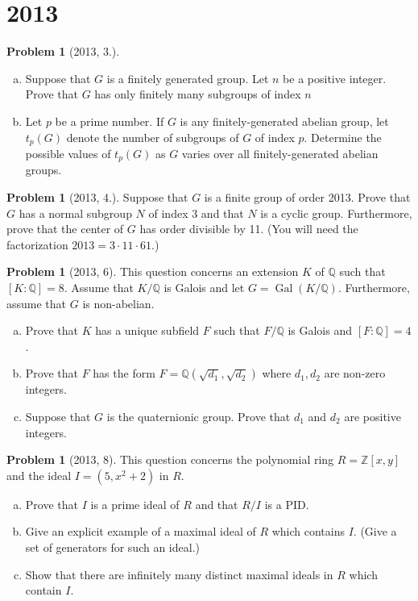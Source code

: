 \documentclass{article}
\newcommand{\<}{\langle} %
\renewcommand{\>}{\rangle} %
\DeclareMathOperator{\Gal}{Gal}
\theoremstyle{plain}
\theoremstyle{remark}
\theoremstyle{definition}
\newcounter{question}
\newtheorem{examproblem}[equation]{Problem}
\begin{document}
\newpage

\section{2013}

\begin{examproblem}[2013, 3.]
	\begin{enumerate}[(a)]
		\item Suppose that $G$ is a finitely generated group. Let $n$
			be a positive integer. Prove that $G$ has only finitely
			many subgroups of index $n$
		\item Let $p$ be a prime number. If $G$ is any finitely-generated
			abelian group, let $t_p(G)$ denote the number of
			subgroups of $G$ of index $p$. Determine the possible
			values of $t_p(G)$ as $G$ varies over all
			finitely-generated abelian groups.
	\end{enumerate}
\end{examproblem}

\begin{examproblem}[2013, 4.]
	Suppose that $G$ is a finite group of order 2013. Prove that $G$ has
	a normal subgroup $N$ of index 3 and that $N$ is a cyclic group.
	Furthermore, prove that the center of $G$ has order divisible by 11.
	(You will need the factorization $2013=3\cdot11\cdot61$.)
\end{examproblem}

\begin{examproblem}[2013, 6]
	This question concerns an extension $K$ of $\mathbb Q$ such that
	$[K:\mathbb Q]=8$. Assume that $K/\mathbb Q$ is Galois and let
	$G=\Gal(K/\mathbb Q)$. Furthermore, assume that $G$ is non-abelian.
	\begin{enumerate}[(a)]
		\item Prove that $K$ has a unique subfield $F$ such that
			$F/\mathbb Q$ is Galois and $[F:\mathbb Q]=4$.
		\item Prove that $F$ has the form $F=\mathbb Q(\sqrt{d_1},\sqrt{d_2})$
			where $d_1,d_2$ are non-zero integers.
		\item Suppose that $G$ is the quaternionic group. Prove
			that $d_1$ and $d_2$ are positive integers.
	\end{enumerate}
\end{examproblem}

\begin{examproblem}[2013, 8]
	This question concerns the polynomial ring $R=\mathbb Z[x,y]$ and the ideal
	$I=(5,x^2+2)$ in $R$.
	\begin{enumerate}[(a)]
		\item Prove that $I$ is a prime ideal of $R$ and that $R/I$ is
			a PID.
		\item Give an explicit example of a maximal ideal of $R$ which
			contains $I$. (Give a set of generators for such an ideal.)
		\item Show that there are infinitely many distinct maximal ideals
			in $R$ which contain $I$.
	\end{enumerate}
\end{examproblem}
\end{document}
